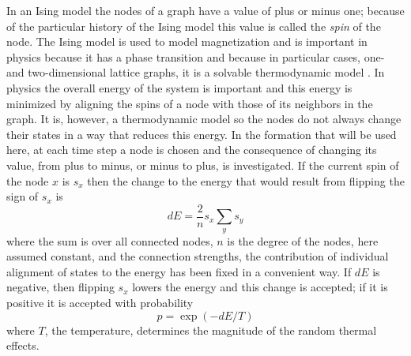 \documentclass[letterpaper]{article}
\begin{document}
In an Ising model the nodes of a graph have a value of plus or minus one; because of the particular history of the Ising model this value is called the \textsl{spin} of the node. The Ising model is used to model magnetization and is important in physics because it has a phase transition and because in particular cases, one- and two-dimensional lattice graphs, it is a solvable thermodynamic model \cite{Onsager1944}. In physics the overall energy of the system is important and this energy is minimized by aligning the spins of a node with those of its neighbors in the graph. It is, however, a thermodynamic model so the nodes do not always change their states in a way that reduces this energy. In the formation that will be used here, at each time step a node is chosen and the consequence of changing its value, from plus to minus, or minus to plus, is investigated. If the current spin of the node $x$ is $s_x$ then the change to the energy that would result from flipping the sign of $s_x$ is
\begin{equation}
dE=\frac{2}{n}s_x\sum_y s_y
\end{equation}
where the sum is over all connected nodes, $n$ is the degree of the nodes, here assumed constant, and the connection strengths, the contribution of individual alignment of states to the energy has been fixed in a convenient way. If $dE$ is negative, then flipping $s_x$ lowers the energy and this change is accepted; if it is positive it is accepted with probability
\begin{equation}
    p=\exp{(-dE/T)}
\end{equation}
where $T$, the temperature, determines the magnitude of the random thermal effects. 
\end{document}
